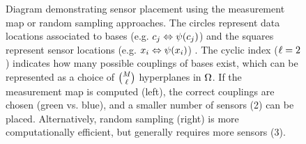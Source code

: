 \begin{figure}[ht!]
\begin{minipage}{\textwidth}
\begin{minipage}{0.47\textwidth}
{{
  } %
  } %
  \end{minipage} 
  \end{minipage} 
  \caption{
  Diagram demonstrating sensor placement using the measurement map or random sampling approaches. 
  The circles represent data locations associated to bases (e.g. $c_j\Leftrightarrow\psi(c_j)$) 
  and the squares represent sensor locations (e.g. $x_i\Leftrightarrow\psi(x_i)$) .
  The cyclic index ($\ell=2$) indicates how many possible couplings of bases exist, 
  which can be represented 
  as a choice of $\binom{M}{\ell}$ hyperplanes in $\Omega$. If the measurement map is 
  computed (left), the correct couplings are chosen (green vs. blue), and a smaller number of sensors (2) can be placed.
  Alternatively, random sampling (right) is more computationally efficient, but generally
  requires more sensors (3). 
  }\label{fig:sensplace}
\end{figure}
